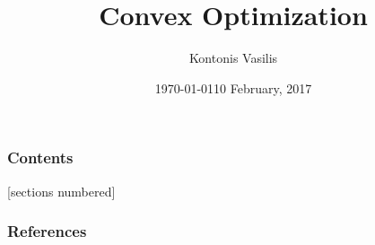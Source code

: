 \documentclass[10pt]{beamer}
\begin{document}
\title{Convex Optimization}
\subtitle{}
\date{\today}
\author{Kontonis Vasilis}

\date{10 February, 2017}
\maketitle

\begin{frame}
  \frametitle{Contents}
  [sections numbered]
  \tableofcontents[hideallsubsections]
\end{frame}





\nocite{boyd_convex_2004}

\begin{frame}[allowframebreaks]
  \frametitle{References}
  
  
\end{frame}
\end{document}
